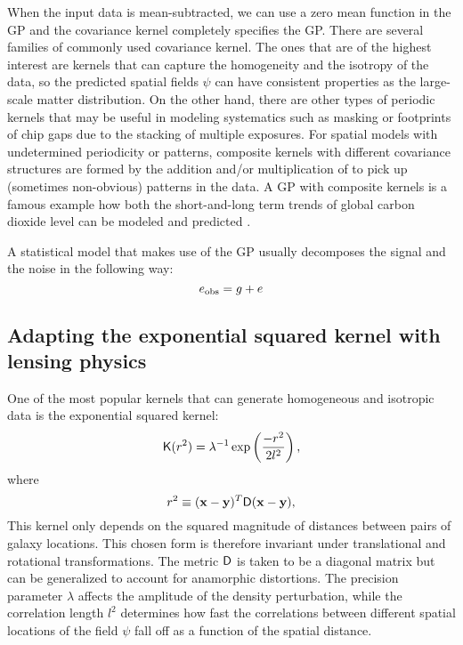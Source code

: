 When the input data is mean-subtracted, we can use a zero mean function in the
GP and the covariance kernel completely specifies the GP. 
There are several families of commonly used covariance kernel.
The ones that are of the highest interest are kernels that can capture 
the homogeneity and the isotropy of the data, so the predicted spatial fields
$\psi$ can have consistent properties as the large-scale matter distribution.
On the other hand, there are other types of periodic kernels that may be useful
in modeling systematics such as masking or footprints of chip gaps due to the
stacking of multiple exposures.
For spatial models with undetermined periodicity or patterns, 
composite kernels with different covariance structures 
are formed by the addition and/or multiplication of
 to pick up (sometimes non-obvious) patterns in the data. 
A GP with composite kernels is a
famous example how both the short-and-long term trends of global carbon
dioxide level can be modeled and predicted \citep{Duvenaud2013}.

A statistical model that makes use of the GP usually decomposes 
the signal and the noise in the following way: 
\begin{equation}
	e_{\rm obs} = g + e_{}  
\end{equation}




\subsection{Adapting the exponential squared kernel with lensing physics}
One of the most popular kernels that can generate homogeneous and
isotropic data is the exponential squared kernel: 
\begin{equation}
	\mathsf{K}(r^2) = \lambda^{-1} \exp\left(\frac{-r^2}{2 l^2}\right),
	\label{eq:exp_sq_kernel}
\end{equation}
where 
\begin{equation}
	r^2 \equiv (\mathbf{x} - \mathbf{y})^T \mathsf{D} (\mathbf{x} - \mathbf{y}), 
\end{equation}
This kernel only depends on the
squared magnitude of distances between pairs of galaxy locations. 
This chosen form is therefore invariant
under translational and rotational transformations.
The metric $\mathsf{D}$ is taken to be a diagonal matrix but  
can be generalized to account for anamorphic distortions. 
The precision parameter $\lambda$ affects the 
amplitude of the density perturbation, while the correlation length $l^2$ 
determines how fast the correlations between different spatial locations of the
field $\psi$ fall off as a function of the spatial distance.

